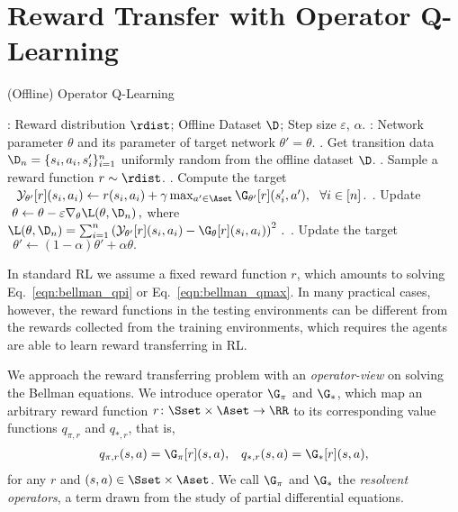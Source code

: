 \section{Reward Transfer with Operator Q-Learning}

\begin{algorithm*}[t] 
\caption{(Offline) Operator Q-Learning}  
\label{alg:operator_q_learning_main}
\begin{algorithmic} 
: 
Reward distribution $\rdist$;
Offline Dataset $\D$;
Step size $\varepsilon$, $\alpha$.
:
Network parameter $\theta$ and its parameter of target network $\theta' = \theta$.
\REPEAT
{}
    . Get transition data $\D_n = \{s_i,a_i,s_i'\}_{i=1}^n$ uniformly random from the offline dataset $\D$.
    . Sample a reward function $r\sim \rdist$.
    . Compute the target 
    $
        ~~\mathcal{Y}_{\theta'} [r](s_i, a_i) \gets r(s_i,a_i) + \gamma 
         \max_{a'\in \Aset}\G_{\theta'}[r](s_i',a'),
        ~~\forall i\in[n]\,.
    $
    . Update
    $
        ~\theta \gets \theta - \varepsilon \nabla_{\theta} \L(\theta, \D_n)\,,
    $
    where 
    $
         \L(\theta, \D_n) = \sum_{i=1}^n \left(\mathcal{Y}_{\theta'} [r](s_i,a_i) - \G_\theta [r](s_i,a_i)\right)^2\,.
    $ 
    . Update the target
    $
        ~~\theta' \gets (1-\alpha)\theta' + \alpha \theta.
    $
\end{algorithmic} 
\end{algorithm*}

In standard RL we assume a fixed reward function $r$, 
which amounts to solving Eq.~\eqref{eqn:bellman_qpi} or Eq.~\eqref{eqn:bellman_qmax}. 
In many practical cases, however, 
the reward functions in the testing environments 
can be different from the rewards collected from the training environments, 
which requires the agents are able to learn reward transferring in RL. 

We approach the reward transferring problem with an \emph{operator-view} on solving the Bellman equations. 
We introduce operator $\G_{\pi}$ and $\G_*$, 
which map an arbitrary reward function $r\colon \Sset \times \Aset \to \RR$ to its corresponding value functions $q_{\pi,r}$ and $q_{*,r}$, that is, 
\begin{align*} 
q_{\pi,r}(s,a) = \G_{\pi}[r](s,a),  && 
q_{*,r}(s,a) = \G_{*}[r](s,a),
\end{align*}
for any $r$ and $(s,a)\in \Sset\times \Aset$. 
We call $\G_{\pi}$ and $\G_*$ the \emph{resolvent operators}, a term drawn from the study of 
partial differential equations. 

